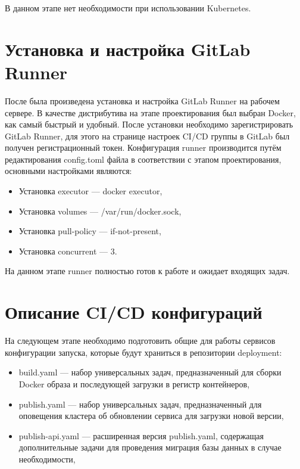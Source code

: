 В данном этапе нет необходимости при использовании Kubernetes.

\section{Установка и настройка GitLab Runner}

После была произведена установка и настройка GitLab Runner на рабочем сервере.
В качестве дистрибутива на этапе проектирования был выбран Docker, как самый быстрый и удобный.
После установки необходимо зарегистрировать GitLab Runner, для этого на странице настроек CI/CD группы в GitLab был получен регистрационный токен.
Конфигурация runner производится путём редактирования config.toml\cite{web:gitlab:docs} файла в соответствии с этапом проектирования, основными настройками являются:

\begin{itemize}
    \item Установка executor --- docker executor,
    \item Установка volumes --- /var/run/docker.sock\cite{web:docker:docs},
    \item Установка pull-policy --- if-not-present,
    \item Установка concurrent --- 3.
\end{itemize}

На данном этапе runner полностью готов к работе и ожидает входящих задач.

\section{Описание CI/CD конфигураций}

На следующем этапе необходимо подготовить общие для работы сервисов конфигурации запуска, которые будут храниться в репозитории deployment:

\begin{itemize}
    \item build.yaml --- набор универсальных задач, предназначенный для сборки Docker образа и последующей загрузки в регистр контейнеров,
    \item publish.yaml --- набор универсальных задач, предназначенный для оповещения кластера об обновлении сервиса для загрузки новой версии,
    \item publish-api.yaml --- расширенная версия publish.yaml, содержащая дополнительные задачи для проведения миграция базы данных в случае необходимости,
\end{itemize}

